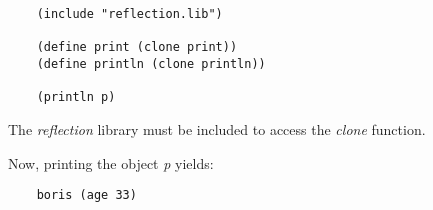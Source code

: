 \begin{verbatim}
    (include "reflection.lib")

    (define print (clone print))
    (define println (clone println))

    (println p)
\end{verbatim}

The {\it reflection} library must be included
to access the {\it clone} function.

Now, printing the object {\it p} yields:

\begin{verbatim}
    boris (age 33)
\end{verbatim}
